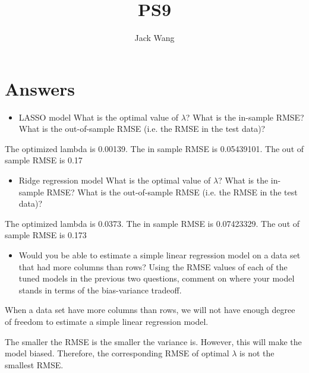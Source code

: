 \documentclass{article}
\title{PS9}
\author{Jack Wang}
\begin{document}
\maketitle


\section{Answers}

\begin{itemize}
\item LASSO model
What is the optimal value of $\lambda$? What is the in-sample RMSE? What is the
out-of-sample RMSE (i.e. the RMSE in the test data)?
\end{itemize}

The optimized lambda is 0.00139. The in sample RMSE is 0.05439101. The out of sample RMSE is 0.17

\begin{itemize}
\item Ridge regression model
What is the optimal value of $\lambda$? What is the in-sample RMSE? What is the
out-of-sample RMSE (i.e. the RMSE in the test data)?
\end{itemize}

The optimized lambda is 0.0373. The in sample RMSE is 0.07423329. The out of sample RMSE is 0.173


\begin{itemize}
\item Would you be able to estimate a simple linear regression model on a data set that had more columns than rows? Using the RMSE values of each of the tuned models in the previous two questions, comment on where your model stands in terms of the bias-variance tradeoff.
\end{itemize}

When a data set have more columns than rows, we will not have enough degree of freedom to estimate a simple linear regression model.

The smaller the RMSE is the smaller the variance is. However, this will make the model biased. Therefore, the corresponding RMSE of optimal $\lambda$ is not the smallest RMSE.
\end{document}
